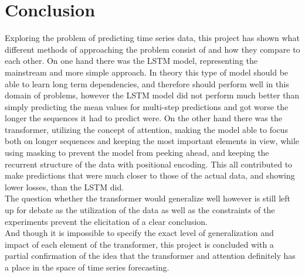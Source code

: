 \documentclass[main.tex]{subfiles}
\begin{document}
\section{Conclusion}

Exploring the problem of predicting time series data, this project has shown what different methods of approaching the problem consist of and how they compare to each other. On one hand there was the LSTM model, representing the mainstream and more simple approach. In theory this type of model should be able to learn long term dependencies, and therefore should perform well in this domain of problems, however the LSTM model did not perform much better than simply predicting the mean values for multi-step predictions and got worse the longer the sequences it had to predict were. On the other hand there was the transformer, utilizing the concept of attention, making the model able to focus both on longer sequences and keeping the most important elements in view, while using masking to prevent the model from peeking ahead, and keeping the recurrent structure of the data with positional encoding. This all contributed to make predictions that were much closer to those of the actual data, and showing lower losses, than the LSTM did.\\
The question whether the transformer would generalize well however is still left up for debate as the utilization of the data as well as the constraints of the experiments prevent the elicitation of a clear conclusion. \\
And though it is impossible to specify the exact level of generalization and impact of each element of the transformer, this project is concluded with a partial confirmation of the idea that the transformer and attention definitely has a place in the space of  time series forecasting.
\end{document}
